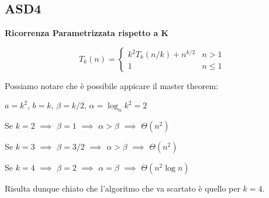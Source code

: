 \documentclass[../cheatSheetAlgoritmi.tex]{subfiles}
\begin{document}
\subsection{ASD4}
\textbf{Ricorrenza Parametrizzata rispetto a K}
\begin{center}
	\begin{equation*}
  		T_{k}(n)=\begin{cases}
    		k^{2}T_{k}(n/k) + n^{k/2}  & \text{$n > 1$}\\
    		1 & \text{$n \leq 1$}
  		\end{cases}
	\end{equation*}
\end{center}
Possiamo notare che è possibile appicare il master theorem:

$a = k^{2}$, $b = k$, $\beta = k/2$, $\alpha = \log_{n}{k^{2}}= 2$

Se $k = 2$ $\implies$ $\beta = 1$ $\implies$ $\alpha > \beta$ $\implies$ $\Theta(n^{2})$

Se $k = 3$ $\implies$ $\beta = 3/2$ $\implies$ $\alpha > \beta$ $\implies$ $\Theta(n^{2})$

Se $k = 4$ $\implies$ $\beta = 2$ $\implies$ $\alpha = \beta$ $\implies$ $\Theta(n^{2}\log{n})$

Risulta dunque chiato che l'algoritmo che va scartato è quello per $k = 4$.
\end{document}
